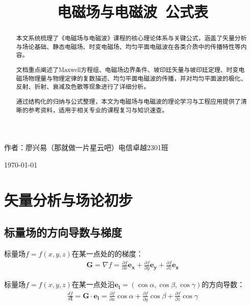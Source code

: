 \documentclass[withoutpreface,bwprint]{cumcmthesis} %
\title{\Huge{电磁场与电磁波\ 公式表}}
\begin{document}
\maketitle

\begin{center}
    \begin{Large}
        作者：廖兴易（那就做一片星云吧）\quad 电信卓越2301班

        \today
    \end{Large}
\end{center}

\begin{abstract}
    本文系统梳理了《电磁场与电磁波》课程的核心理论体系与关键公式，涵盖了矢量分析与场论基础、静态电磁场、时变电磁场、均匀平面电磁波在各类介质中的传播特性等内容。
    
    文档重点阐述了Maxwell方程组、电磁场边界条件、坡印廷矢量与坡印廷定理、时变电磁场物理量与物理定律的复数描述、均匀平面电磁波的传播，并对均匀平面波的极化、反射、折射、衰减及色散等现象进行了详细分析。
    
    通过结构化的归纳与公式整理，本文为电磁场与电磁波的理论学习与工程应用提供了清晰的参考资料，适用于相关专业的课程复习与知识速查。

\end{abstract}

\begin{center}
    \tableofcontents
\end{center}

\newpage 

\section{矢量分析与场论初步}

\subsection{标量场的方向导数与梯度}

标量场$f = f(x, y, z)$在某一点处的的梯度：
\begin{align}
    \boldsymbol{G} = \nabla f = \frac{\partial f}{\partial x}\boldsymbol{e_x} + \frac{\partial f}{\partial y}\boldsymbol{e_y} + \frac{\partial f}{\partial z}\boldsymbol{e_z}
\end{align}

标量场$f = f(x, y, z)$在某一点处沿$\boldsymbol {e_l} = (\cos \alpha, \cos \beta, \cos \gamma)$的方向导数：
\begin{align}
    \frac{df}{d\boldsymbol{l}} = \boldsymbol{G} \cdot \boldsymbol {e_l} = \frac{\partial f}{\partial x}\cos \alpha + \frac{\partial f}{\partial y}\cos \beta + \frac{\partial f}{\partial z}\cos \gamma
\end{align}
\end{document}
